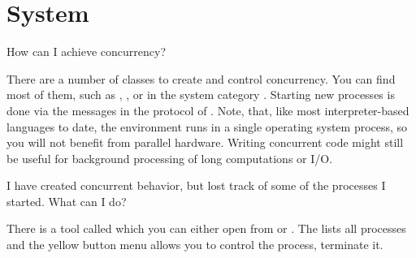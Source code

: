 \documentclass[a4paper,10pt,twoside]{book}
\begin{document}
\section{System}

\begin{faq}
How can I achieve concurrency?
\end{faq}
\answer
There are a number of classes to create and control concurrency.
You can find most of them, such as , , or  in the system category .
Starting new processes is done via the messages in the  protocol of .
Note, that, like most interpreter-based languages to date, the \sq environment runs in a single operating system process, so you will not benefit from parallel hardware.
Writing concurrent code might still be useful for background processing of long computations or I/O.

\begin{faq}
I have created concurrent behavior, but lost track of some of the processes I started. 
What can I do?
\end{faq}
\answer
There is a tool called  which you can either open from  or . 
The  lists all processes and the yellow button menu allows you to control the process, \eg terminate it.
\end{document}
